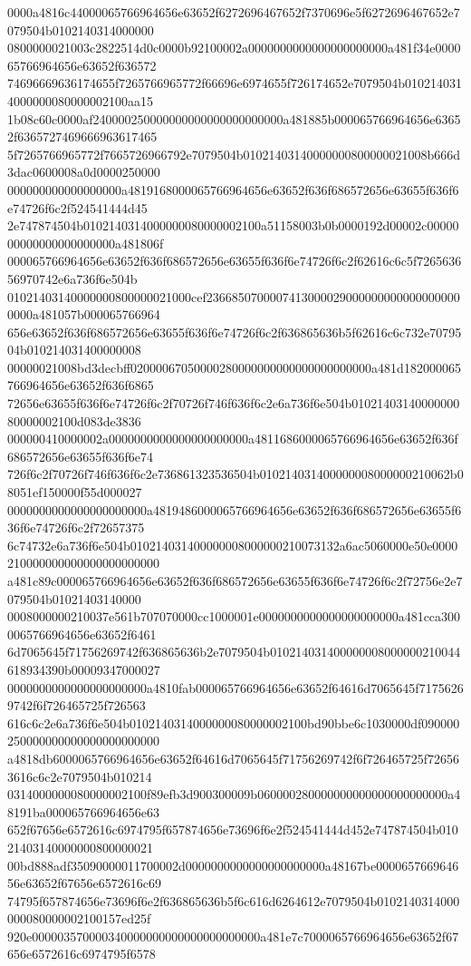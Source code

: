 {0000a4816c44000065766964656e63652f6272696467652f7370696e5f6272696467652e7079504b0102140314000000
0800000021003c2822514d0c0000b92100002a0000000000000000000000a481f34e000065766964656e63652f636572
74696669636174655f7265766965772f66696e6974655f726174652e7079504b0102140314000000080000002100aa15
1b08c60c0000af240000250000000000000000000000a481885b000065766964656e63652f6365727469666963617465
5f7265766965772f7665726966792e7079504b01021403140000000800000021008b666d3dac0600008a0d0000250000
000000000000000000a4819168000065766964656e63652f636f686572656e63655f636f6e74726f6c2f524541444d45
2e747874504b0102140314000000080000002100a51158003b0b0000192d00002c0000000000000000000000a481806f
000065766964656e63652f636f686572656e63655f636f6e74726f6c2f62616c6c5f726563656970742e6a736f6e504b
01021403140000000800000021000cef23668507000074130000290000000000000000000000a481057b000065766964
656e63652f636f686572656e63655f636f6e74726f6c2f636865636b5f62616c6c732e7079504b010214031400000008
00000021008bd3decbff02000067050000280000000000000000000000a481d182000065766964656e63652f636f6865
72656e63655f636f6e74726f6c2f70726f746f636f6c2e6a736f6e504b0102140314000000080000002100d083de3836
000000410000002a0000000000000000000000a4811686000065766964656e63652f636f686572656e63655f636f6e74
726f6c2f70726f746f636f6c2e736861323536504b010214031400000008000000210062b08051ef150000f55d000027
0000000000000000000000a4819486000065766964656e63652f636f686572656e63655f636f6e74726f6c2f72657375
6c74732e6a736f6e504b010214031400000008000000210073132a6ac5060000e50e0000210000000000000000000000
a481c89c000065766964656e63652f636f686572656e63655f636f6e74726f6c2f72756e2e7079504b01021403140000
0008000000210037e561b707070000cc1000001e0000000000000000000000a481cca3000065766964656e63652f6461
6d7065645f71756269742f636865636b2e7079504b010214031400000008000000210044618934390b00009347000027
0000000000000000000000a4810fab000065766964656e63652f64616d7065645f71756269742f6f726465725f726563
616c6c2e6a736f6e504b0102140314000000080000002100bd90bbe6c1030000df090000250000000000000000000000
a4818db6000065766964656e63652f64616d7065645f71756269742f6f726465725f726563616c6c2e7079504b010214
0314000000080000002100f89efb3d900300009b060000280000000000000000000000a48191ba000065766964656e63
652f67656e6572616c6974795f657874656e73696f6e2f524541444d452e747874504b01021403140000000800000021
00bd888adf35090000011700002d0000000000000000000000a48167be000065766964656e63652f67656e6572616c69
74795f657874656e73696f6e2f636865636b5f6c616d6264612e7079504b0102140314000000080000002100157ed25f
920e000003570000340000000000000000000000a481e7c7000065766964656e63652f67656e6572616c6974795f6578
}
